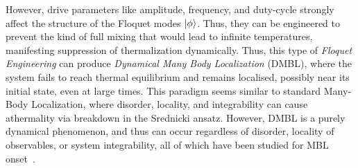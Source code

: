 \documentclass[%
reprint,
superscriptaddress,
amsmath,amssymb,
aps,
prb,
showkeys,
]{revtex4-2}
\begin{document}
However, drive parameters like amplitude, frequency, and duty-cycle strongly affect the structure of the Floquet modes $\ket{\phi}$. Thus, they can be engineered to prevent the kind of full mixing that would lead to infinite temperatures, manifesting suppression of thermalization dynamically. Thus, this type of \textit{Floquet Engineering} can produce \textit{Dynamical Many Body Localization} (DMBL), where the system fails to reach thermal equilibrium and remains localised, possibly  near its initial state, even at large times. This paradigm seems similar to standard Many-Body Localization\cite{yousefjani2023, sierant_2023}, where disorder, locality, and integrability can cause athermality via breakdown in the Srednicki ansatz. However, DMBL is a purely dynamical phenomenon, and thus can occur regardless of disorder, locality of observables, or system integrability, all of which have been studied for MBL onset~\cite{Sougata2023,Fabien2018,garratt_resonant_2022}.
\end{document}
